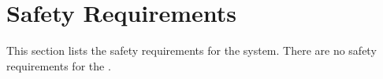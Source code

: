 \KNEADSECTIONNEWPAGE
\section{Safety Requirements}
\label{lab:sec_Safety}
% 

This section lists the safety requirements for the system. There are no safety requirements for the \ThisSystem.



% 

